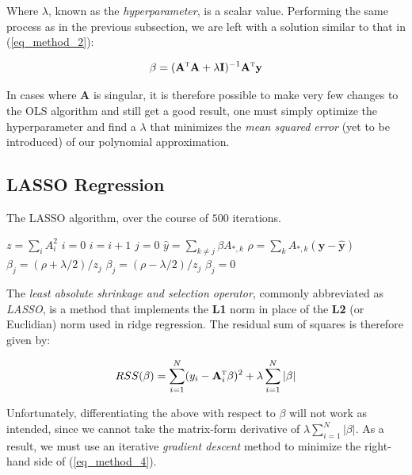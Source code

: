 \documentclass[a4paper,10pt,english]{article}
\begin{document}
Where $\lambda$, known as the \textit{hyperparameter}, is a scalar value. Performing the same process as in the previous subsection, we are left with a solution similar to that in (\ref{eq_method_2}):

\begin{equation}
\label{eq_method_3}
\beta = (\mathbf{A}^\textsc{t} \mathbf{A} + \lambda \mathbf{I}) ^{-1} \mathbf{A}^\textsc{t} \mathbf{y}
\end{equation}

In cases where $\mathbf{A}$ is singular, it is therefore possible to make very few changes to the OLS algorithm and still get a good result, one must simply optimize the hyperparameter and find a $\lambda$ that minimizes the \textit{mean squared error} (yet to be introduced) of our polynomial approximation.

\subsection{LASSO Regression}

\begin{algorithm}[H]
	\caption{The LASSO algorithm, over the course of $500$ iterations.}
	\begin{algorithmic}[1]
		\State $z = \sum_i A_i^2$
		\State $i = 0$
		\State $i = i + 1$
		\State $j = 0$
		\State $\hat{y} = \sum_{k \neq j} \beta A_{*,k}$
		\State $\rho = \sum_k A_{*,k} (\mathbf{y} - \mathbf{\hat{y}})$
		\State $\beta_j = (\rho + \lambda/2)/z_j$
		\State $\beta_j = (\rho - \lambda/2)/z_j$
		\Else
		\State $\beta_j = 0$
		\EndIf
		\EndWhile		
		\EndWhile
	\end{algorithmic}
\end{algorithm}


The \textit{least absolute shrinkage and selection operator}, commonly abbreviated as \textit{LASSO}, is a method that implements the \textbf{L1} norm in place of the \textbf{L2} (or Euclidian) norm used in ridge regression.  The residual sum of squares is therefore given by:

\begin{equation}
\label{eq_method_4}
RSS(\beta) = \sum_{i=1}^N (y_i - \mathbf{A}_i^\textsc{t} \beta)^2 + \lambda \sum_{i=1}^N |\beta|
\end{equation}

Unfortunately, differentiating the above with respect to $\beta$ will not work as intended, since we cannot take the matrix-form derivative of $\lambda \sum_{i=1}^N |\beta|$.  As a result, we must use an iterative \textit{gradient descent} method to minimize the right-hand side of (\ref{eq_method_4}).
\end{document}
